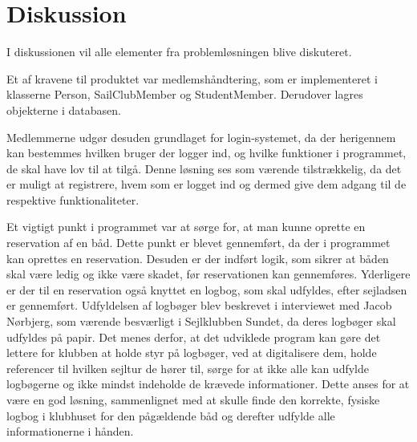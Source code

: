 \chapter{Diskussion}

I diskussionen vil alle elementer fra problemløsningen blive diskuteret. 

Et af kravene til produktet var medlemshåndtering, som er implementeret i klasserne Person, SailClubMember og StudentMember. 
Derudover lagres objekterne i databasen. 

Medlemmerne udgør desuden grundlaget for login-systemet, da der herigennem kan bestemmes hvilken bruger der logger ind, og hvilke funktioner i programmet, de skal have lov til at tilgå.  
Denne løsning ses som værende tilstrækkelig, da det er muligt at registrere, hvem som er logget ind og dermed give dem adgang til de respektive funktionaliteter. 

Et vigtigt punkt i programmet var at sørge for, at man kunne oprette en reservation af en båd. 
Dette punkt er blevet gennemført, da der i programmet kan oprettes en reservation. 
Desuden er der indført logik, som sikrer at båden skal være ledig og ikke være skadet, før reservationen kan gennemføres. 
Yderligere er der til en reservation også knyttet en logbog, som skal udfyldes, efter sejladsen er gennemført. 
Udfyldelsen af logbøger blev beskrevet i interviewet med Jacob Nørbjerg, som værende besværligt i Sejlklubben Sundet, da deres logbøger skal udfyldes på papir. 
Det menes derfor, at det udviklede program kan gøre det lettere for klubben at holde styr på logbøger, ved at digitalisere dem, holde referencer til hvilken sejltur de hører til, sørge for at ikke alle kan udfylde logbøgerne og ikke mindst indeholde de krævede informationer. 
Dette anses for at være en god løsning, sammenlignet med at skulle finde den korrekte, fysiske logbog i klubhuset for den pågældende båd og derefter udfylde alle informationerne i hånden. 

